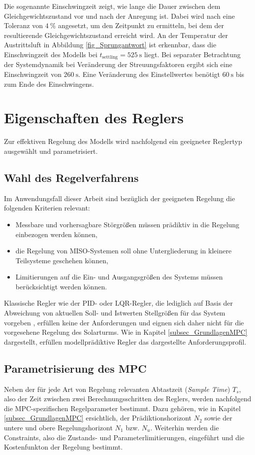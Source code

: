 Die sogenannte Einschwingzeit zeigt, wie lange die Dauer zwischen dem Gleichgewichtszustand vor und nach der Anregung ist.
Dabei wird nach \cite[S.223]{Zacher} eine Toleranz von $\SI{4}{\percent}$ angesetzt, um den Zeitpunkt zu ermitteln, bei dem der resultierende Gleichgewichtszustand erreicht wird.
An der Temperatur der Austrittsluft in Abbildung \ref{fig_Sprungantwort} ist erkennbar, dass die Einschwingzeit des Modells bei $t_{\mathrm{settling}} = \SI{525}{\second}$ liegt.
Bei separater Betrachtung der Systemdynamik bei Veränderung der Streuungsfaktoren ergibt sich eine Einschwingzeit von $\SI{260}{\second}$.
Eine Veränderung des Einstellwertes benötigt $\SI{60}{\second}$ bis zum Ende des Einschwingens.


\section{Eigenschaften des Reglers} \label{sec_Reglereigenschaften}
Zur effektiven Regelung des Modells wird nachfolgend ein geeigneter Reglertyp ausgewählt und parametrisiert.

\subsection{Wahl des Regelverfahrens} \label{subsec_ReglerverfahrenWahl}
Im Anwendungsfall dieser Arbeit sind bezüglich der geeigneten Regelung die folgenden Kriterien relevant:
\begin{itemize}
\item Messbare und vorhersagbare Störgrößen müssen prädiktiv in die Regelung einbezogen werden können,
    \item die Regelung von MISO-Systemen soll ohne Untergliederung in kleinere Teilsysteme geschehen können,
\item Limitierungen auf die Ein- und Ausgangsgrößen des Systems müssen berücksichtigt werden können.
\end{itemize}
Klassische Regler wie der PID- oder LQR-Regler, die lediglich auf Basis der Abweichung von aktuellen Soll- und Istwerten Stellgrößen für das System vorgeben \cite[S.408]{Lunze}, erfüllen keine der Anforderungen und eignen sich daher nicht für die vorgesehene Regelung des Solarturms.
Wie in Kapitel \ref{subsec_GrundlagenMPC} dargestellt, erfüllen modellprädiktive Regler das dargestellte Anforderungsprofil.


\subsection{Parametrisierung des MPC} \label{subsec_ParameterMPC}
Neben der für jede Art von Regelung relevanten Abtastzeit (\textit{Sample Time}) $T_s$, also der Zeit zwischen zwei Berechnungsschritten des Reglers, werden nachfolgend die MPC-spezifischen Regelparameter bestimmt.
Dazu gehören, wie in Kapitel \ref{subsec_GrundlagenMPC} ersichtlich, der Prädiktionshorizont $N_2$ sowie der untere und obere Regelungshorizont $N_1$ bzw. $N_u$.
Weiterhin werden die Constraints, also die Zustands- und Parameterlimitierungen, eingeführt und die Kostenfunkton der Regelung bestimmt.

